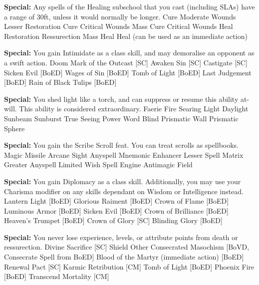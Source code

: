\begin{multicols}{2}
\textbf{Special: }{Any spells of the Healing subschool that you cast (including SLAs) have a range of 30ft, unless it would normally be longer.}
\sphere
{Cure Moderate Wounds}
{Lesser Restoration}
{Cure Critical Wounds}
{Mass Cure Critical Wounds}
{Heal}
{Restoration}
{Ressurection}
{Mass Heal}
{Heal (can be used as an immediate action)}

\textbf{Special: }{You gain Intimidate as a class skill, and may demoralise an opponent as a swift action.}
\sphere
{Doom}
{Mark of the Outcast [SC]}
{Awaken Sin [SC]}
{Castigate [SC]}
{Sicken Evil [BoED]}
{Wages of Sin [BoED]}
{Tomb of Light [BoED]}
{Last Judgement [BoED]}
{Rain of Black Tulips [BoED]}

\textbf{Special: }{You shed light like a torch, and can suppress or resume this ability at-will. This ability is considered extraordinary.}
\sphere
{Faerie Fire}
{Searing Light}
{Daylight}
{Sunbeam}
{Sunburst}
{True Seeing}
{Power Word Blind}
{Prismatic Wall}
{Prismatic Sphere}

\textbf{Special: }{You gain the Scribe Scroll feat. You can treat scrolls as spellbooks.}
\sphere
{Magic Missile}
{Arcane Sight}
{Anyspell}
{Mnemonic Enhancer}
{Lesser Spell Matrix}
{Greater Anyspell}
{Limited Wish}
{Spell Engine}
{Antimagic Field}

\textbf{Special: }{You gain Diplomacy as a class skill. Additionally, you may use your Charisma modifier on any skills dependant on Wisdom or Intelligence instead.}
\sphere
{Lantern Light [BoED]}
{Glorious Raiment [BoED]}
{Crown of Flame [BoED]}
{Luminous Armor [BoED]}
{Sicken Evil [BoED]}
{Crown of Brilliance [BoED] }
{Heaven's Trumpet [BoED]}
{Crown of Glory [SC]}
{Blinding Glory [BoED]}

\textbf{Special: }{You never lose experience, levels, or attribute points from death or ressurection.}
\sphere
{Divine Sacrifice [SC]}
{Shield Other}
{Consecrated Masochism [BoVD, Consecrate Spell from BoED]}
{Blood of the Martyr (immediate action) [BoED]}
{Renewal Pact [SC]}
{Karmic Retribution [CM]}
{Tomb of Light [BoED]}
{Phoenix Fire [BoED]}
{Transcend Mortality [CM]}


\end{multicols}
